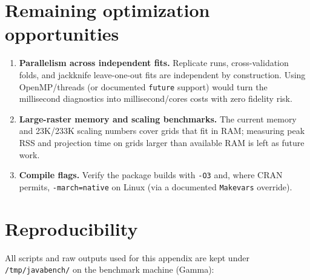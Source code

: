 \section{Remaining optimization opportunities}

\begin{enumerate}[leftmargin=1.2em]
\item \textbf{Parallelism across independent fits.} Replicate runs,
cross-validation folds, and jackknife leave-one-out fits are
independent by construction.  Using OpenMP/threads (or documented
\texttt{future} support) would turn the millisecond diagnostics into
millisecond/cores costs with zero fidelity risk.
\item \textbf{Large-raster memory and scaling benchmarks.} The current
memory and 23K/233K scaling numbers cover grids that fit in RAM;
measuring peak RSS and projection time on grids larger than available
RAM is left as future work.
\item \textbf{Compile flags.} Verify the package builds with
\texttt{-O3} and, where CRAN permits, \texttt{-march=native} on Linux
(via a documented \texttt{Makevars} override).
\end{enumerate}

\section{Reproducibility}
\label{sec:repro}

All scripts and raw outputs used for this appendix are kept under
\texttt{/tmp/javabench/} on the benchmark machine (Gamma):

